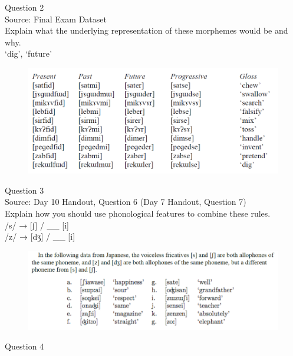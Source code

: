 \documentclass[12pt]{article}
\begin{document}
\newpage

{\large Question 2}\\

Source: Final Exam Dataset\\

Explain what the underlying representation of these morphemes would be and why.\\

`dig', `future'

\begin{figure}[H]
\includegraphics{../images/final_dataset.png}
\end{figure}

\newpage

{\large Question 3}\\

Source: Day 10 Handout, Question 6 (Day 7 Handout, Question 7)\\

Explain how you should use phonological features to combine these rules.\\

/s/ → {[ʃ]} / \_\_ {[i]} \\/z/ → {[dʒ]} / \_\_ {[i]}

\begin{figure}[H]
\includegraphics{../images/japanese.png}
\end{figure}

\newpage

{\large Question 4}\\
\end{document}
